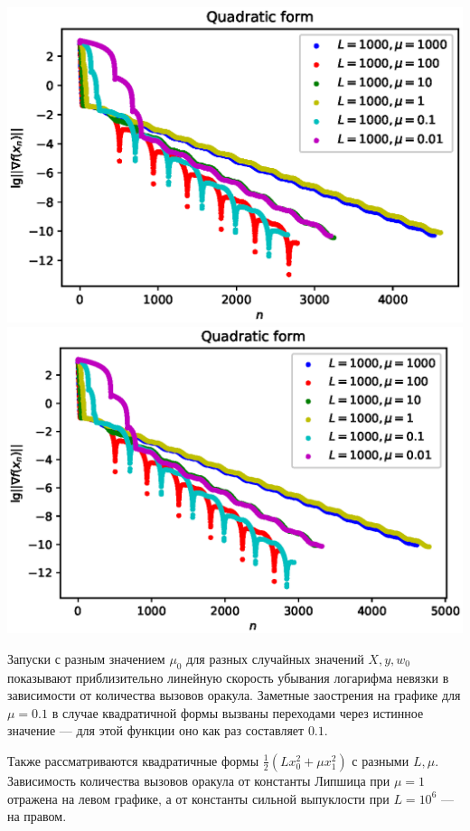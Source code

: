 \documentclass{crm-article}
\begin{document}
\noindent
\includegraphics[scale=0.5]{plots/test_acgm3.eps}
\includegraphics[scale=0.5]{plots/test_acgm4.eps}

Запуски с разным значением $\mu_0$ для разных случайных значений $X, y, w_0$ показывают приблизительно линейную скорость убывания логарифма невязки в зависимости от количества вызовов оракула. Заметные заострения на графике для $\mu=0.1$ в случае квадратичной формы вызваны переходами через истинное значение --- для этой функции оно как раз составляет $0.1$.

Также рассматриваются квадратичные формы $\frac{1}{2}(Lx_0^2+\mu x_1^2)$ с разными $L,\mu$. Зависимость количества вызовов оракула от константы Липшица при $\mu=1$ отражена на левом графике, а от константы сильной выпуклости при $L=10^6$ --- на правом.
\end{document}
